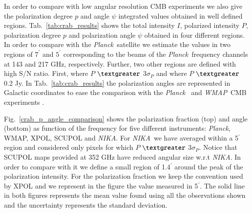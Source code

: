 \documentclass[twocolumn,traditabstract]{aa}
\def\NIKA{\textit{NIKA}}
\def\Planck{\textit{Planck}}
\def\WMAP{\textit{WMAP}}
\begin{document}
In order to compare with low angular resolution CMB experiments we also give the polarization degree $p$ and angle $\psi$ integrated values obtained in well defined regions. 
Tab.~\ref{tab:crab_results} shows the total intensity $I$, polarized intensity $P$, polarization degree $p$ and polarization angle $\psi$ obtained in four different regions. In order to compare with the \Planck\ satellite we estimate the values in two regions of $7^{\prime}$ and $5^{\prime}$ corresponding to the beams of the \Planck\ frequency channels at 143 and 217 GHz, respectively. 
Further, two other regions are defined with high S/N ratio. First, where $P$ $\textgreater$ $3\sigma_P$ and  where $P$ $\textgreater$ 0.2 Jy. 
In Tab.~\ref{tab:crab_results} the polarization angles are represented in Galactic coordinates to ease the comparison with the \Planck\ \citep{2015arXiv150702058P} and \WMAP\ CMB experiments \citep{2011ApJS..192...19W}. 

Fig.~\ref{crab_p_angle_comparison} shows the polarization fraction (top) and angle (bottom) as function of the frequency for five different instruments: \Planck, WMAP, XPOL, SCUPOL and \NIKA.
For \NIKA\ we have averaged within a 5$^\prime$ region and considered only pixels for which $P$ $\textgreater$ $3\sigma_P$. Notice that SCUPOL maps \citep{scubapol} provided at 352 GHz have reduced angular size w.r.t \NIKA. In order to compare with it we define a small region of 1.4$^\prime$ around the peak of the polarization intensity. 
For the polarization fraction we keep the convention used by XPOL \citep{aumont2010} and we represent in the figure the value measured in 5$^{\prime}$. 
The solid line in both figures represents the mean value found using all the observations shown and the uncertainty represents the standard deviation. 
\end{document}
